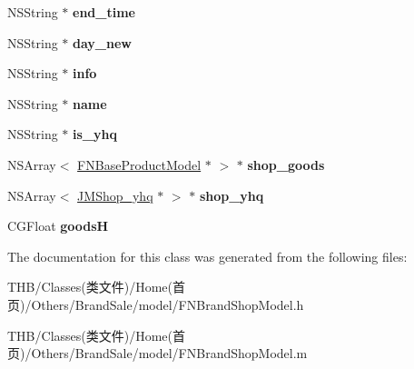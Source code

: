 \begin{DoxyCompactItemize}
N\+S\+String $\ast$ {\bfseries end\+\_\+time}
\item 
\mbox{\label{interface_f_n_brand_shop_model_a04c8d87371c860f6148cee12984f2db9}} 
N\+S\+String $\ast$ {\bfseries day\+\_\+new}
\item 
\mbox{\label{interface_f_n_brand_shop_model_a7056843d982b6dcf7ef956b29e9f6635}} 
N\+S\+String $\ast$ {\bfseries info}
\item 
\mbox{\label{interface_f_n_brand_shop_model_a7b127cc986407e5be7f8b547c7efb208}} 
N\+S\+String $\ast$ {\bfseries name}
\item 
\mbox{\label{interface_f_n_brand_shop_model_ae64961558c76227dac00b64a6dd4f164}} 
N\+S\+String $\ast$ {\bfseries is\+\_\+yhq}
\item 
\mbox{\label{interface_f_n_brand_shop_model_a051d8cbdf70760376e6cacb1934f9a74}} 
N\+S\+Array$<$ \mbox{\hyperlink{interface_f_n_base_product_model}{F\+N\+Base\+Product\+Model}} $\ast$ $>$ $\ast$ {\bfseries shop\+\_\+goods}
\item 
\mbox{\label{interface_f_n_brand_shop_model_a2c43cf857d0273ed2b8a1903dcaabc9f}} 
N\+S\+Array$<$ \mbox{\hyperlink{interface_j_m_shop__yhq}{J\+M\+Shop\+\_\+yhq}} $\ast$ $>$ $\ast$ {\bfseries shop\+\_\+yhq}
\item 
\mbox{\label{interface_f_n_brand_shop_model_a1f47cb88db408df35471865b39142d8f}} 
C\+G\+Float {\bfseries goodsH}
\end{DoxyCompactItemize}


The documentation for this class was generated from the following files\+:\begin{DoxyCompactItemize}
\item 
T\+H\+B/\+Classes(类文件)/\+Home(首页)/\+Others/\+Brand\+Sale/model/F\+N\+Brand\+Shop\+Model.\+h\item 
T\+H\+B/\+Classes(类文件)/\+Home(首页)/\+Others/\+Brand\+Sale/model/F\+N\+Brand\+Shop\+Model.\+m\end{DoxyCompactItemize}
